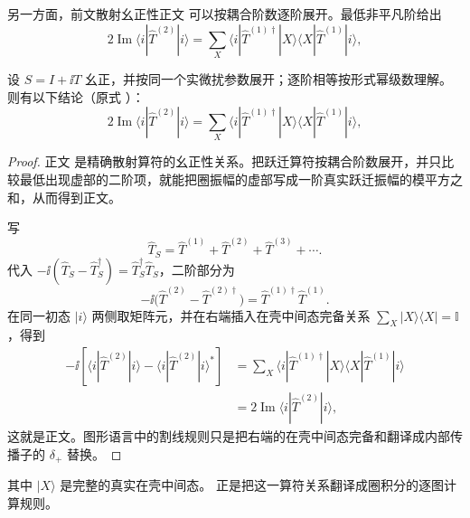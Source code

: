 另一方面，前文散射幺正性正文 可以按耦合阶数逐阶展开。最低非平凡阶给出
\begin{equation}
 \boxed{
 2\operatorname{Im}\langle i|\hat T^{(2)}|i\rangle
 =\sum_X
 \langle i|\hat T^{(1)\dagger}|X\rangle
 \langle X|\hat T^{(1)}|i\rangle,}
 \label{eq:perturbative-optical-theorem-dp68}
\end{equation}

\begin{proposition}[幺正性的逐阶恒等式]
设 $S=I+\ii T$ 幺正，并按同一个实微扰参数展开；逐阶相等按形式幂级数理解。则有以下结论（原式 ）：
\begin{equation*}
 \boxed{
 2\operatorname{Im}\langle i|\hat T^{(2)}|i\rangle
 =\sum_X
 \langle i|\hat T^{(1)\dagger}|X\rangle
 \langle X|\hat T^{(1)}|i\rangle,}
\end{equation*}
\end{proposition}
\begin{proof}
正文 是精确散射算符的幺正性关系。把跃迁算符按耦合阶数展开，并只比较最低出现虚部的二阶项，就能把圈振幅的虚部写成一阶真实跃迁振幅的模平方之和，从而得到正文。

写
\begin{equation*}
 \hat T_S=\hat T^{(1)}+\hat T^{(2)}+\hat T^{(3)}+\cdots .
\end{equation*}
代入
$-\ii(\hat T_S-\hat T_S^\dagger)=\hat T_S^\dagger\hat T_S$，二阶部分为
\begin{equation*}
 -\ii\bigl(\hat T^{(2)}-\hat T^{(2)\dagger}\bigr)
 =\hat T^{(1)\dagger}\hat T^{(1)}.
\end{equation*}
在同一初态 $|i\rangle$ 两侧取矩阵元，并在右端插入在壳中间态完备关系 $\sum_X|X\rangle\langle X|=\mathbb I$，得到
\begin{align*}
 -\ii\left[
 \langle i|\hat T^{(2)}|i\rangle
 -\langle i|\hat T^{(2)}|i\rangle^*
 \right]
 &=\sum_X
 \langle i|\hat T^{(1)\dagger}|X\rangle
 \langle X|\hat T^{(1)}|i\rangle\\
 &=2\operatorname{Im}\langle i|\hat T^{(2)}|i\rangle,
\end{align*}
这就是正文。图形语言中的割线规则只是把右端的在壳中间态完备和翻译成内部传播子的 $\delta_+$ 替换。
\end{proof}

其中 $|X\rangle$ 是完整的真实在壳中间态。 正是把这一算符关系翻译成圈积分的逐图计算规则。

